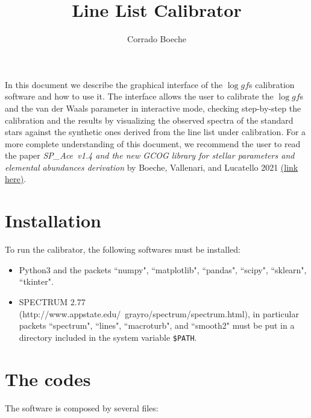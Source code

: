 \documentclass[a4paper,10pt]{article}
\title{Line List Calibrator}
\author{Corrado Boeche}
\newcommand\loggf{$\log gf$}
\newcommand\Space{SP\_Ace}
\begin{document}
\maketitle

In this document we describe the graphical interface of the
\loggf s calibration software and how to use it. The interface allows the
user to calibrate the \loggf s and the van der Waals parameter in
interactive mode, checking step-by-step the calibration and the results by
visualizing the observed spectra of the standard stars against the synthetic
ones derived from the line list under calibration. For a more complete
understanding of this document, we recommend the user to read the paper 
{\em \Space\ v1.4 and the new GCOG library for stellar parameters and 
elemental abundances derivation} by 
Boeche, Vallenari, and 
Lucatello 2021
\href{https://ui.adsabs.harvard.edu/abs/2021A%26A...645A..35B/abstract}{(link
here)}.

\section{Installation}
To run the calibrator, the following softwares must be installed:\\

\begin{itemize}
%
\item Python3 and the packets ``numpy", ``matplotlib", ``pandas",
``scipy", ``sklearn", ``tkinter".
%
\item SPECTRUM 2.77 (http://www.appstate.edu/~grayro/spectrum/spectrum.html),
in particular packets ``spectrum", ``lines", ``macroturb", and ``smooth2"
must be put in a directory included in the system variable {\tt \$PATH}.

\end{itemize}

\section{The codes}
The software is composed by several files:\\
\end{document}
